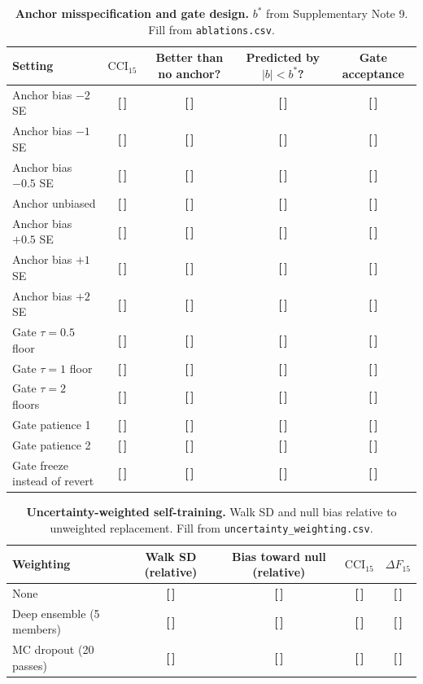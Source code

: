 \documentclass[11pt,a4paper]{article}
\newcommand{\T}{{\color{red}\textbf{[\,]}}}
\newcommand{\CCI}{\mathrm{CCI}}
\begin{document}
\begin{table}[!htbp]\centering\footnotesize
\caption{\textbf{Anchor misspecification and gate design.} $b^*$ from Supplementary Note 9. Fill from \texttt{ablations.csv}.}
\begin{tabularx}{\textwidth}{@{}p{3.9cm} C C C C@{}}\toprule
Setting & $\CCI_{15}$ & Better than no anchor? & Predicted by $|b|<b^*$? & Gate acceptance\\\midrule
Anchor bias $-2$ SE & \T & \T & \T & \T\\
Anchor bias $-1$ SE & \T & \T & \T & \T\\
Anchor bias $-0.5$ SE & \T & \T & \T & \T\\
Anchor unbiased & \T & \T & \T & \T\\
Anchor bias $+0.5$ SE & \T & \T & \T & \T\\
Anchor bias $+1$ SE & \T & \T & \T & \T\\
Anchor bias $+2$ SE & \T & \T & \T & \T\\
\midrule
Gate $\tau=0.5$ floor & \T & \T & \T & \T\\
Gate $\tau=1$ floor & \T & \T & \T & \T\\
Gate $\tau=2$ floors & \T & \T & \T & \T\\
Gate patience 1 & \T & \T & \T & \T\\
Gate patience 2 & \T & \T & \T & \T\\
Gate freeze instead of revert & \T & \T & \T & \T\\
\bottomrule\end{tabularx}
\end{table}
\FloatBarrier
\begin{table}[!htbp]\centering\footnotesize
\caption{\textbf{Uncertainty-weighted self-training.} Walk SD and null bias relative to unweighted replacement. Fill from \texttt{uncertainty\_weighting.csv}.}
\begin{tabularx}{\textwidth}{@{}p{3.9cm} C C C C@{}}\toprule
Weighting & Walk SD (relative) & Bias toward null (relative) & $\CCI_{15}$ & $\Delta F_{15}$\\\midrule
None & \T & \T & \T & \T\\
Deep ensemble (5 members) & \T & \T & \T & \T\\
MC dropout (20 passes) & \T & \T & \T & \T\\
\bottomrule\end{tabularx}
\end{table}
\FloatBarrier
\end{document}
